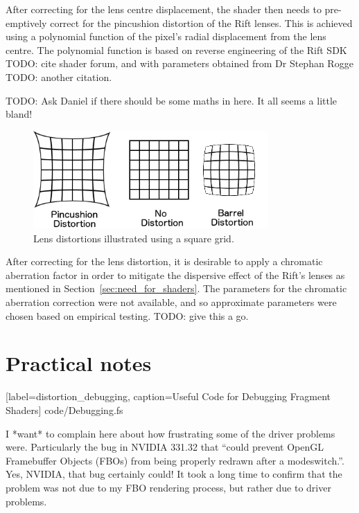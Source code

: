\documentclass[MSc,paper=a4,pagesize=auto]{icldt}
\begin{document}
After correcting for the lens centre displacement, the shader then needs to pre-emptively correct for the pincushion distortion of the Rift lenses. This is achieved using a polynomial function of the pixel's radial displacement from the lens centre. The polynomial function is based on reverse engineering of the Rift SDK TODO: cite shader forum, and with parameters obtained from Dr Stephan Rogge TODO: another citation. 

TODO: Ask Daniel if there should be some maths in here. It all seems a little bland!

\begin{figure}[htbp!]
    \centering
    \includegraphics[width=0.8\textwidth]{resources/distortions}
    \caption{Lens distortions illustrated using a square grid.}
    \label{fig:distortions}
\end{figure}

After correcting for the lens distortion, it is desirable to apply a chromatic aberration factor in order to mitigate the dispersive effect of the Rift's lenses as mentioned in Section~\ref{sec:need_for_shaders}. The parameters for the chromatic aberration correction were not available, and so approximate parameters were chosen based on empirical testing. TODO: give this a go. 

\section{Practical notes}


  [label=distortion_debugging, caption=Useful Code for Debugging Fragment Shaders]
  {code/Debugging.fs}
  
I *want* to complain here about how frustrating some of the driver problems were. Particularly the bug in NVIDIA 331.32 that ``could prevent OpenGL Framebuffer Objects (FBOs) from being properly redrawn after a modeswitch.''. Yes, NVIDIA, that bug certainly could! It took a long time to confirm that the problem was not due to my FBO rendering process, but rather due to driver problems.
\end{document}
